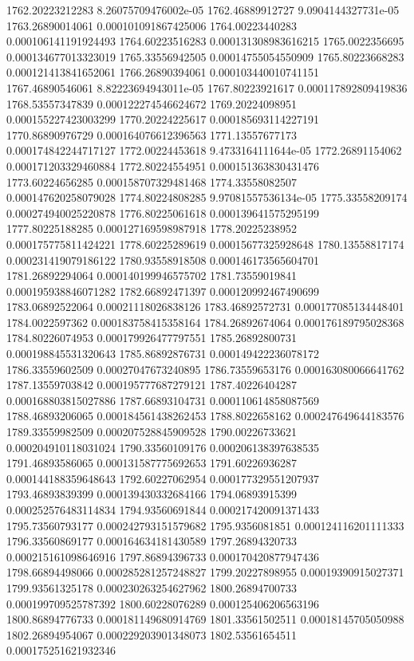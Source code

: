 {1762.20223212283 8.26075709476002e-05
1762.46889912727 9.0904144327731e-05
1763.26890014061 0.000101091867425006
1764.00223440283 0.000106141191924493
1764.60223516283 0.000131308983616215
1765.0022356695 0.000134677013323019
1765.33556942505 0.00014755054550909
1765.80223668283 0.000121413841652061
1766.26890394061 0.000103440010741151
1767.46890546061 8.82223694943011e-05
1767.80223921617 0.000117892809419836
1768.53557347839 0.000122274546624672
1769.20224098951 0.000155227423003299
1770.20224225617 0.000185693114227191
1770.86890976729 0.000164076612396563
1771.13557677173 0.000174842244717127
1772.00224453618 9.4733164111644e-05
1772.26891154062 0.000171203329460884
1772.80224554951 0.000151363830431476
1773.60224656285 0.000158707329481468
1774.33558082507 0.000147620258079028
1774.80224808285 9.97081557536134e-05
1775.33558209174 0.000274940025220878
1776.80225061618 0.000139641575295199
1777.80225188285 0.000127169598987918
1778.20225238952 0.000175775811424221
1778.60225289619 0.00015677325928648
1780.13558817174 0.000231419079186122
1780.93558918508 0.000146173565604701
1781.26892294064 0.000140199946575702
1781.73559019841 0.000195938846071282
1782.66892471397 0.000120992467490699
1783.06892522064 0.00021118026838126
1783.46892572731 0.000177085134448401
1784.0022597362 0.000183758415358164
1784.26892674064 0.000176189795028368
1784.80226074953 0.000179926477797551
1785.26892800731 0.000198845531320643
1785.86892876731 0.000149422236078172
1786.33559602509 0.00027047673240895
1786.73559653176 0.000163080066641762
1787.13559703842 0.000195777687279121
1787.40226404287 0.000168803815027886
1787.66893104731 0.000110614858087569
1788.46893206065 0.000184561438262453
1788.8022658162 0.000247649644183576
1789.33559982509 0.000207528845909528
1790.00226733621 0.000204910118031024
1790.33560109176 0.000206138397638535
1791.46893586065 0.000131587775692653
1791.60226936287 0.000144188359648643
1792.60227062954 0.000177329551207937
1793.46893839399 0.000139430332684166
1794.06893915399 0.000252576483114834
1794.93560691844 0.000217420091371433
1795.73560793177 0.000242793151579682
1795.9356081851 0.000124116201111333
1796.33560869177 0.000164634181430589
1797.26894320733 0.000215161098646916
1797.86894396733 0.000170420877947436
1798.66894498066 0.000285281257248827
1799.20227898955 0.00019390915027371
1799.93561325178 0.000230263254627962
1800.26894700733 0.000199709525787392
1800.60228076289 0.000125406206563196
1800.86894776733 0.000181149680914769
1801.33561502511 0.00018145705050988
1802.26894954067 0.000229203901348073
1802.53561654511 0.000175251621932346
}
